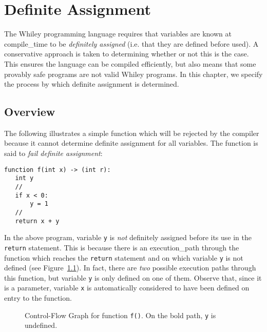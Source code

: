 \chapter{Definite Assignment}
\label{c_definite_assignment}

The Whiley programming language requires that variables are known at \gls{compile_time} to be {\em definitely assigned} (i.e. that they are defined before used).  A conservative approach is taken to determining whether or not this is the case.  This ensures the language can be compiled efficiently, but also means that some provably safe programs are not valid Whiley programs.  In this chapter, we specify the process by which definite assignment is determined.

\section{Overview}

The following illustrates a simple function which will be rejected by the compiler because it cannot determine definite assignment for all variables.  The function is said to {\em fail definite assignment}:

\begin{lstlisting}
function f(int x) -> (int r):
   int y
   //
   if x < 0:
       y = 1
   //
   return x + y
\end{lstlisting}

In the above program, variable \lstinline{y} is {\em not} definitely assigned before its use in the \lstinline{return} statement.  This is because there is an \gls{execution_path} through the function which reaches the \lstinline{return} statement and on which variable \lstinline{y} is not defined (see Figure~\ref{f:c8_cfg_1}).  In fact, there are {\em two} possible execution paths through this function, but variable \lstinline{y} is only defined on one of them.  Observe that, since it is a parameter, variable \lstinline{x} is automatically considered to have been defined on entry to the function.


\begin{figure}[!t]
\centering
\caption{Control-Flow Graph for function \lstinline{f()}.  On the bold path, \lstinline{y} is undefined.}
\label{f:c8_cfg_1}
\end{figure}


